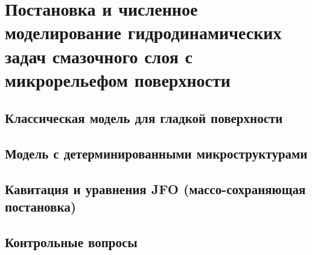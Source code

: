 \chapter{Постановка и численное моделирование гидродинамических задач смазочного слоя с микрорельефом поверхности}

\section{Классическая модель для гладкой поверхности}

\FloatBarrier

\FloatBarrier

\FloatBarrier

\FloatBarrier

\FloatBarrier

\FloatBarrier


\FloatBarrier
\section{Модель с детерминированными микроструктурами}

\FloatBarrier

\FloatBarrier

\FloatBarrier


\FloatBarrier
\section{Кавитация и уравнения JFO (массо-сохраняющая постановка)}

\FloatBarrier

\FloatBarrier


% 

\FloatBarrier
\section*{Контрольные вопросы}

